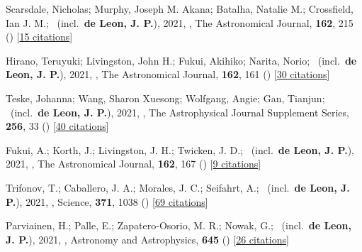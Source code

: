 \item[{\color{numcolor}\scriptsize38}] Scarsdale, Nicholas; Murphy, Joseph M. Akana; Batalha, Natalie M.; Crossfield, Ian J. M.; \etal\ (incl.\ \textbf{de Leon, J. P.}), 2021, , The Astronomical Journal, \textbf{162}, 215 () [\href{https://ui.adsabs.harvard.edu/abs/2021AJ....162..215S}{15 citations}]

\item[{\color{numcolor}\scriptsize37}] Hirano, Teruyuki; Livingston, John H.; Fukui, Akihiko; Narita, Norio; \etal\ (incl.\ \textbf{de Leon, J. P.}), 2021, , The Astronomical Journal, \textbf{162}, 161 () [\href{https://ui.adsabs.harvard.edu/abs/2021AJ....162..161H}{30 citations}]

\item[{\color{numcolor}\scriptsize36}] Teske, Johanna; Wang, Sharon Xuesong; Wolfgang, Angie; Gan, Tianjun; \etal\ (incl.\ \textbf{de Leon, J. P.}), 2021, , The Astrophysical Journal Supplement Series, \textbf{256}, 33 () [\href{https://ui.adsabs.harvard.edu/abs/2021ApJS..256...33T}{40 citations}]

\item[{\color{numcolor}\scriptsize35}] Fukui, A.; Korth, J.; Livingston, J. H.; Twicken, J. D.; \etal\ (incl.\ \textbf{de Leon, J. P.}), 2021, , The Astronomical Journal, \textbf{162}, 167 () [\href{https://ui.adsabs.harvard.edu/abs/2021AJ....162..167F}{9 citations}]

\item[{\color{numcolor}\scriptsize34}] Trifonov, T.; Caballero, J. A.; Morales, J. C.; Seifahrt, A.; \etal\ (incl.\ \textbf{de Leon, J. P.}), 2021, , Science, \textbf{371}, 1038 () [\href{https://ui.adsabs.harvard.edu/abs/2021Sci...371.1038T}{69 citations}]

\item[{\color{numcolor}\scriptsize33}] Parviainen, H.; Palle, E.; Zapatero-Osorio, M. R.; Nowak, G.; \etal\ (incl.\ \textbf{de Leon, J. P.}), 2021, , Astronomy and Astrophysics, \textbf{645} () [\href{https://ui.adsabs.harvard.edu/abs/2021A&A...645A..16P}{26 citations}]

